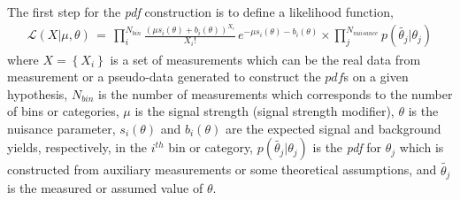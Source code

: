 %
The first step for the \textit{pdf} construction is to define 
a likelihood function,  
\begin{eqnarray} 
\mathcal{L} ( X | \mu, \theta) 
\, = \,
\prod_{i}^{N_{bin}} \frac{ \left( \mu s_i(\theta) + b_i(\theta) \right)^{X_i}}{X_i!} 
\, e^{ - \mu s_i(\theta) - b_i(\theta) }   \times
\prod_{j}^{N_{nuisance}} p\left( \tilde{\theta_j} | \theta_j \right)
\end{eqnarray}
where $X=\left\{X_i\right\}$ is a set of measurements which can be   
the real data from measurement or a pseudo-data generated 
to construct the $pdf$s on a given hypothesis, $N_{bin}$ is the number of 
measurements which corresponds to the number of bins or categories, 
$\mu$ is the signal strength (signal strength modifier),
$\theta$ is the nuisance parameter, 
$s_i(\theta)$ and $b_i(\theta)$ are the expected signal and background 
yields, respectively, in the $i^{th}$ bin or category,
$p\left( \tilde{\theta_j} | \theta_j \right)$ is the \textit{pdf} for 
$\theta_j$ which is constructed from auxiliary measurements or some theoretical  
assumptions, and $\tilde{\theta_j}$ is the measured or assumed value of $\theta$. 


